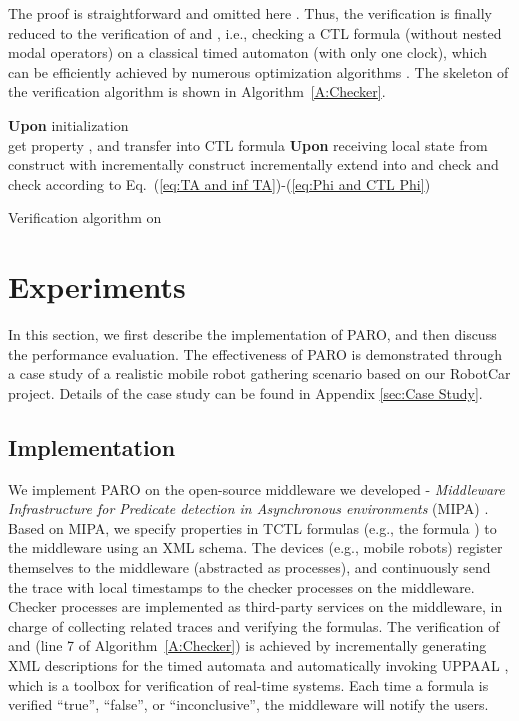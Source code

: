 \documentclass[10pt,conference,compsocconf,letterpaper]{IEEEtran}
\begin{document}
The proof is straightforward and omitted here \cite{Baier08}. Thus, the verification is finally reduced to the verification of  and , i.e., checking a CTL formula (without nested modal operators) on a classical timed automaton (with only one clock), which can be efficiently achieved by numerous optimization algorithms \cite{Baier08, Dill89, Laroussinie04, Wang04}. The skeleton of the verification algorithm is shown in Algorithm~\ref{A:Checker}.
\begin{algorithm}[tbp]
\SetAlgoVlined
\textbf{Upon} initialization\\
\hspace{0.4cm}get property , and transfer  into CTL formula \;
\textbf{Upon} receiving local state  from \\
\hspace{0.4cm}construct  with  incrementally\;
\hspace{0.4cm}construct  incrementally\;
\hspace{0.4cm}extend  into  and \;
\hspace{0.4cm}check  and \;\label{line:check}
\hspace{0.4cm}check  according to Eq.~(\ref{eq:TA and inf TA})-(\ref{eq:Phi and CTL Phi})\;
\caption{Verification algorithm on \label{A:Checker}}
\end{algorithm}

\section{Experiments} \label{sec:Performance measurements}

In this section, we first describe the implementation of \textsf{PARO}, and then discuss the performance evaluation. The effectiveness of \textsf{PARO} is demonstrated through a case study of a realistic mobile robot gathering scenario based on our RobotCar project. Details of the case study can be found in Appendix \ref{sec:Case Study}.

\subsection{Implementation}

We implement \textsf{PARO} on the open-source middleware we developed - {\it Middleware Infrastructure for Predicate detection in Asynchronous environments} (MIPA) \cite{MIPA}. Based on MIPA, we specify properties in TCTL formulas (e.g., the formula ) to the middleware using an XML schema. The devices (e.g., mobile robots) register themselves to the middleware (abstracted as processes), and continuously send the trace with local timestamps to the checker processes on the middleware. Checker processes are implemented as third-party services on the middleware, in charge of collecting related traces and verifying the formulas. The verification of  and  (line 7 of Algorithm~\ref{A:Checker}) is achieved by incrementally generating XML descriptions for the timed automata and automatically invoking UPPAAL \cite{Behrmann04}, which is a toolbox for verification of real-time systems. Each time a formula is verified ``true'', ``false'', or ``inconclusive'', the middleware will notify the users.
\end{document}
